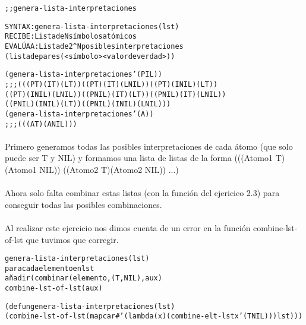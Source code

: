 \begin{aibox}{\function}
\begin{alltt}
;; genera-lista-interpretaciones

SYNTAX: genera-lista-interpretaciones (lst) 
RECIBE   : Lista de N símbolos atómicos
EVALÚA A : Lista de 2^N posibles interpretaciones
             (lista de pares (<símbolo> <valor de verdad>))

\end{alltt}
\end{aibox}

\begin{aibox}{\examples}
\begin{alltt}
(genera-lista-interpretaciones '(P I L))
;;; (((P T) (I T) (L T)) ((P T) (I T) (L NIL)) ((P T) (I NIL) (L T))
 ((P T) (I NIL) (L NIL)) ((P NIL) (I T) (L T)) ((P NIL) (I T) (L NIL))
 ((P NIL) (I NIL) (L T)) ((P NIL) (I NIL) (L NIL)))
 (genera-lista-interpretaciones '(A))
;;; (((A T) (A NIL)))
\end{alltt}

\end{aibox}

\begin{aibox}{\comments}
\paragraph{}
Primero generamos todas las posibles interpretaciones de cada átomo (que solo puede ser T y NIL) y formamos una lista de listas de la forma (((Atomo1 T) (Atomo1 NIL)) ((Atomo2 T)(Atomo2 NIL)) ...)
\paragraph{}
Ahora solo falta combinar estas listas (con la función del ejericico 2.3) para conseguir todas las posibles combinaciones.
\paragraph{}
Al realizar este ejercicio nos dimos cuenta de un error en la función combine-lst-of-lst que tuvimos que corregir.
\end{aibox}

\begin{aibox}{\pseudocode}
\begin{alltt}
genera-lista-interpretaciones (lst)
    para cada elemento en lst
        añadir ( combinar(elemento, (T, NIL), aux)
    combine-lst-of-lst (aux)
\end{alltt}
\end{aibox}
\begin{aibox}{\code}

\begin{alltt}
(defun genera-lista-interpretaciones (lst) 
    (combine-lst-of-lst (mapcar #'(lambda (x) (combine-elt-lst x '(T NIL))) lst)))
\end{alltt}
\end{aibox}
